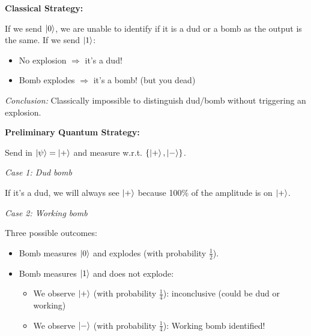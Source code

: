 \textbf{Classical Strategy:}

If we send $\ket{0}$, we are unable to identify if it is a dud or a bomb as the output is the same. If we send $\ket{1}$:
\begin{itemize}
\item No explosion $\Rightarrow$ it's a dud!
\item Bomb explodes $\Rightarrow$ it's a bomb! (but you dead)
\end{itemize}

\textit{Conclusion:} Classically impossible to distinguish dud/bomb without triggering an explosion.

\textbf{Preliminary Quantum Strategy:}

Send in $\ket{\psi} = \ket{+}$ and measure w.r.t. $\{\ket{+}, \ket{-}\}$.

\textit{Case 1: Dud bomb}

If it's a dud, we will always see $\ket{+}$ because 100\% of the amplitude is on $\ket{+}$.

\begin{center}
\end{center}

\textit{Case 2: Working bomb}

Three possible outcomes:
\begin{itemize}
\item Bomb measures $\ket{0}$ and explodes (with probability $\frac{1}{2}$).
\item Bomb measures $\ket{1}$ and does not explode:
\begin{itemize}
\item We observe $\ket{+}$ (with probability $\frac{1}{4}$): inconclusive (could be dud or working)
\item We observe $\ket{-}$ (with probability $\frac{1}{4}$): Working bomb identified!
\end{itemize}
\end{itemize}

